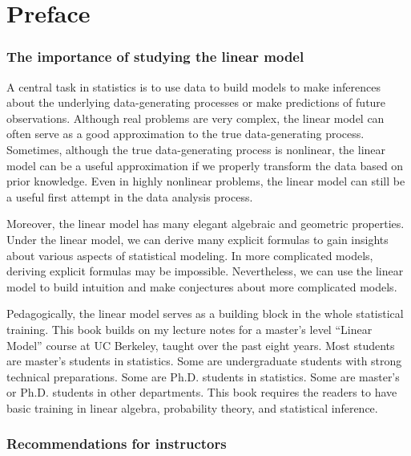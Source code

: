 \chapter*{Preface}




\subsection*{The importance of studying the linear model}


A central task in statistics is to use data to build models to make inferences about the underlying data-generating processes or make predictions of future observations. Although real problems are very complex, the linear model can often serve as a good approximation to the true data-generating process. Sometimes, although the true data-generating process is nonlinear, the linear model can be a useful approximation if we properly transform the data based on prior knowledge. Even in highly nonlinear problems, the linear model can still be a useful first attempt in the data analysis process. 



Moreover, the linear model has many elegant algebraic and geometric properties. Under the linear model, we can derive many explicit formulas to gain insights about various aspects of statistical modeling. In more complicated models, deriving explicit formulas may be impossible. Nevertheless, we can use the linear model to build intuition and make conjectures about more complicated models. 


Pedagogically, the linear model serves as a building block in the whole statistical training. This book builds on my lecture notes for a master's level ``Linear Model'' course at UC Berkeley, taught over the past eight years. Most students are master's students in statistics. Some are undergraduate students with strong technical preparations. Some are Ph.D. students in statistics. Some are master's or Ph.D. students in other departments. This book requires the readers to have basic training in linear algebra, probability theory, and statistical inference. 
 
 
 
 


\subsection*{Recommendations for instructors}



